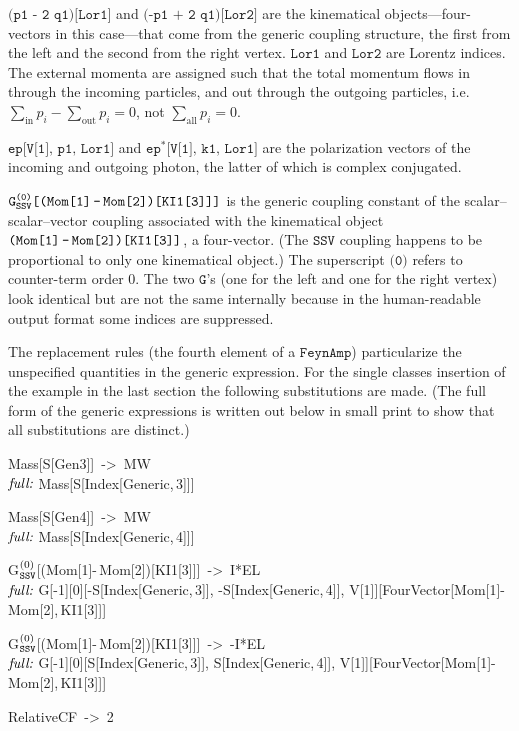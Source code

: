 \documentclass[twoside,12pt]{article}
\def\ie{i.e.\ }
\def\Code#1{\ensuremath{\texttt{#1}}}
\def\Name#1{\ensuremath{\textit{\rmfamily #1}}}
\begin{document}
\Code{(p1 - 2 q1)[Lor1]} and \Code{(-p1 + 2 q1)[Lor2]} are the kinematical
objects---four-vectors in this case---that come from the generic
coupling structure, the first from the left and the second from the
right vertex.  \Code{Lor1} and \Code{Lor2} are Lorentz indices.  The 
external momenta are assigned such that the total momentum flows in 
through the incoming particles, and out through the outgoing particles,
\ie $\sum\limits_{\text{in}} p_i - \sum\limits_{\text{out}} p_i = 0$, 
not $\sum\limits_{\text{all}} p_i = 0$.%
%

\Code{ep[V[1], p1, Lor1]} and \Code{ep$^{\text{*}}$[V[1], k1, Lor1]} are
the polarization vectors of the incoming and outgoing photon, the latter
of which is complex conjugated.%

\Code{G$_{\text{SSV}}^{\text{(0)}}$[(Mom[1]\,-\,Mom[2])[KI1[3]]]} is the
generic coupling constant of the scalar--scalar--vector coupling
associated with the kinematical object
\Code{(Mom[1]\,-\,Mom[2])[KI1[3]]}, a four-vector.  (The \Code{SSV}
coupling happens to be proportional to only one kinematical object.) 
The superscript \Code{(0)} refers to counter-term order 0.  The two
\Code{G}'s (one for the left and one for the right vertex) look
identical but are not the same internally because in the human-readable
output format some indices are suppressed.%

%
The replacement rules (the fourth element of a \Code{FeynAmp}) 
particularize the unspecified quantities in the generic expression.  For
the single classes insertion of the example in the last section the
following substitutions are made.  (The full form of the generic
expressions is written out below in small print to show that all
substitutions are distinct.)

\begin{tt}
Mass[S[Gen3]]\!~->~MW \\[-1ex]
{\scriptsize\Name{full:} Mass[S[Index[Generic,\,3]]]}

Mass[S[Gen4]]\!~->~MW \\[-1ex]
{\scriptsize\Name{full:} Mass[S[Index[Generic,\,4]]]}

G$\tt ^{\text{(0)}}_{SSV}$[(Mom[1]\!\:-\,Mom[2])[KI1[3]]]\!~->~I*EL \\[-1ex]
{\scriptsize\Name{full:} G[-1][0][-S[Index[Generic,\,3]],
-S[Index[Generic,\,4]], V[1]][FourVector[Mom[1]\!\;-\,Mom[2],\,KI1[3]]]}

G$\tt ^{\text{(0)}}_{SSV}$[(Mom[1]\!\:-\,Mom[2])[KI1[3]]]\!~->~-I*EL
\\[-1ex]
{\scriptsize\Name{full:} G[-1][0][S[Index[Generic,\,3]],
S[Index[Generic,\,4]], V[1]][FourVector[Mom[1]\!\;-\,Mom[2],\,KI1[3]]]}

RelativeCF~->~2
\end{tt}
\end{document}
